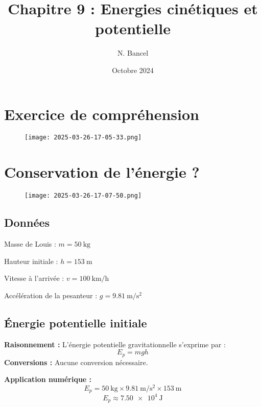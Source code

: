 \documentclass[a4paper,12pt]{article}
\begin{document}
\title{Chapitre 9 : Energies cinétiques et potentielle}
\author{N. Bancel}
\date{Octobre 2024}
\maketitle

\section*{Exercice de compréhension}

\begin{figure}[H]
  \centering
  \texttt{[image: 2025-03-26-17-05-33.png]}
\end{figure}

\section*{Conservation de l'énergie ?}

\begin{figure}[H]
  \centering
  \texttt{[image: 2025-03-26-17-07-50.png]}
\end{figure}

\subsection*{Données}
\begin{compactitem}
    \item Masse de Louis : $m = \SI{50}{\kilo\gram}$
    \item Hauteur initiale : $h = \SI{153}{\meter}$
    \item Vitesse à l'arrivée : $v = \SI{100}{\kilo\meter\per\hour}$
    \item Accélération de la pesanteur : $g = \SI{9.81}{\meter\per\second^2}$
\end{compactitem}

\subsection*{Énergie potentielle initiale}
\textbf{Raisonnement :} L'énergie potentielle gravitationnelle s'exprime par :
\begin{equation}
    E_p = m g h
\end{equation}
\textbf{Conversions :}
Aucune conversion nécessaire.

\textbf{Application numérique :}
\begin{equation}
    E_p = \SI{50}{\kilo\gram} \times \SI{9.81}{\meter\per\second^2} \times \SI{153}{\meter}
\end{equation}
\begin{equation}
    E_p \approx \SI{7.50e4}{\joule}
\end{equation}
\end{document}
